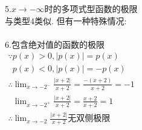 5.$x\to-\infty$时的多项式型函数的极限\\
与类型4类似. 但有一种特殊情况:\\[1ex]
\\[2ex]

6.包含绝对值的函数的极限\\
\begin{math}
\begin{array}{l}
\because p(x)>0, |p(x)|=p(x)\\ 
\phantom{\because}p(x)<0, |p(x)|=-p(x)\\
\displaystyle\therefore\lim_{x\to -2^-}\frac{|x+2|}{x+2}=\frac{-(x+2)}{x+2}=-1\\
\displaystyle\phantom{\therefore}\lim_{x\to -2^+}\frac{|x+2|}{x+2}=\frac{x+2}{x+2}=1\\
\displaystyle\therefore\lim_{x\to -2}\frac{|x+2|}{x+2}\text{无双侧极限}
\end{array}
\end{math}

